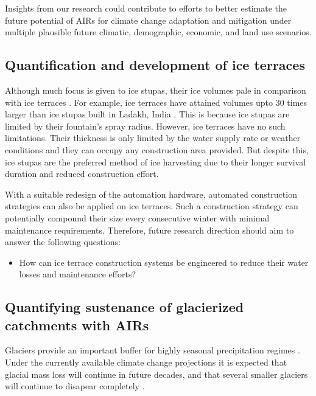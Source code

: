 \documentclass[tc]{copernicus}
\begin{document}
Insights from our research could contribute to efforts to better estimate the future potential of AIRs for
climate change adaptation and mitigation under multiple plausible future climatic, demographic, economic, and
land use scenarios. 

\subsection{Quantification and development of ice terraces}

Although much focus is given to ice stupas, their ice volumes pale in comparison with ice terraces . For
example, ice terraces have attained volumes upto 30 times larger than ice stupas built in Ladakh, India
\citep{nusserSociohydrologyArtificialGlaciers2019}. This is because ice stupas are limited by their fountain's
spray radius. However, ice terraces have no such limitations. Their thickness is only limited by the water
supply rate or weather conditions and they can occupy any construction area provided. But despite this, ice
stupas are the preferred method of ice harvesting due to their longer survival duration and reduced construction
effort.

With a suitable redesign of the automation hardware, automated construction strategies can also be applied on
ice terraces. Such a construction strategy can potentially compound their size every consecutive winter with
minimal maintenance requirements. Therefore, future research direction should aim to answer the following
questions:

\begin{itemize}

  \item How can ice terrace construction systems be engineered to reduce their water losses and maintenance
    efforts?

\end{itemize}

\subsection{Quantifying sustenance of glacierized catchments with AIRs}

Glaciers provide an important buffer for highly seasonal precipitation regimes
\citep{kaserContributionPotentialGlaciers2010}. Under the currently available climate change projections it is
expected that glacial mass loss will continue in future decades, and that several smaller glaciers will continue
to disapear completely \citep{rabatelCurrentStateGlaciers2013}. 
\end{document}

